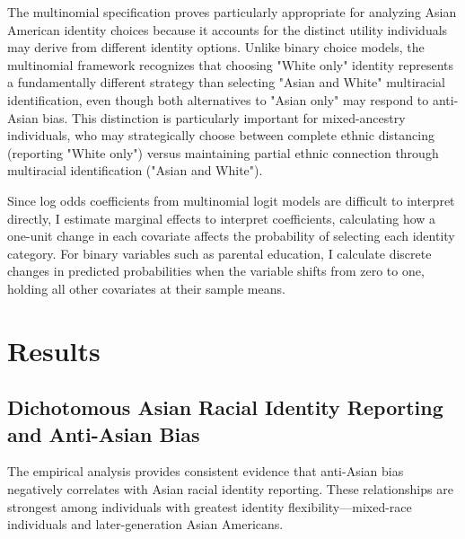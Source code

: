 The multinomial specification proves particularly appropriate for analyzing Asian American identity choices because it accounts for the distinct utility individuals may derive from different identity options. Unlike binary choice models, the multinomial framework recognizes that choosing "White only" identity represents a fundamentally different strategy than selecting "Asian and White" multiracial identification, even though both alternatives to "Asian only" may respond to anti-Asian bias. This distinction is particularly important for mixed-ancestry individuals, who may strategically choose between complete ethnic distancing (reporting "White only") versus maintaining partial ethnic connection through multiracial identification ("Asian and White").

Since log odds coefficients from multinomial logit models are difficult to interpret directly, I estimate marginal effects to interpret coefficients, calculating how a one-unit change in each covariate affects the probability of selecting each identity category. For binary variables such as parental education, I calculate discrete changes in predicted probabilities when the variable shifts from zero to one, holding all other covariates at their sample means.

\section{Results}\label{sec:results}

\subsection*{Dichotomous Asian Racial Identity Reporting and Anti-Asian Bias}\label{sec:results-dichotomous}

The empirical analysis provides consistent evidence that anti-Asian bias negatively correlates with Asian racial identity reporting. These relationships are strongest among individuals with greatest identity flexibility—mixed-race individuals and later-generation Asian Americans.

